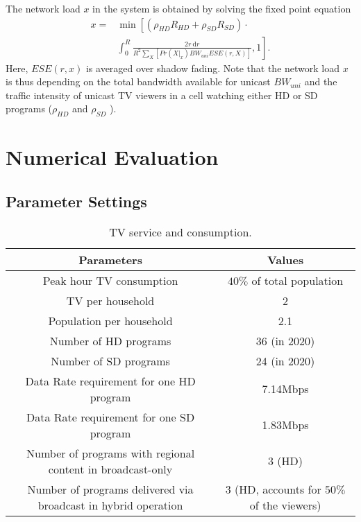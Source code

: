 \documentclass[journal]{IEEEtran}
\begin{document}
The network load $x$ in the system is obtained by solving the fixed point equation
\begin{equation}\label{x}
\begin{aligned}
  x=&\min⁡\left[(\rho_{HD} R_{HD}+\rho_{SD} R_{SD})\cdot\right.\\
  &\left.\int_0^R\!\frac{2r\ \mathrm{d}r}{R^2 \sum_X[Pr⁡(X|_x)BW_{uni}ESE(r,X)]},1\right].
  \end{aligned}
\end{equation}
Here, $ESE(r,x)$ is averaged over shadow fading. Note that the network load $x$ is thus depending on the total bandwidth available for unicast $BW_{uni}$ and the traffic intensity of unicast TV viewers in a cell watching either HD or SD programs ($\rho_{HD}$ and $\rho_{SD}$ ).


\section{Numerical Evaluation}	\label{sec:result}						
\subsection{Parameter Settings}			

\begin{table*}
\caption{TV service and consumption.}\label{table:service}
\centering
\begin{tabular}{|c|c|}
  \hline
Parameters&	Values \\
\hline
Peak hour TV consumption &$40\%$ of total population\\
TV per household	&2\\
Population per household	&2.1\\
Number of HD programs	&36 (in 2020)\\
Number of SD programs	&24 (in 2020)\\
Data Rate requirement for one HD program &7.14Mbps	\\
Data Rate requirement for one SD program &1.83Mbps	\\
Number of programs with regional content in broadcast-only	&3 (HD) \\
Number of programs delivered via broadcast in hybrid operation	&3 (HD, accounts for $50\%$ of the viewers)\\
\hline
\end{tabular}
\end{table*}
\end{document}
